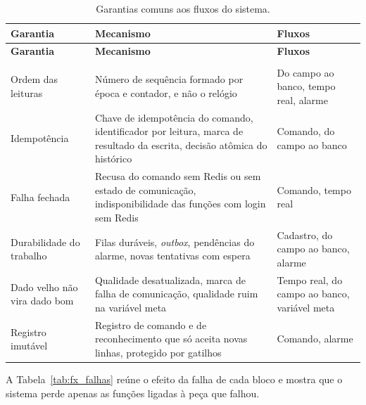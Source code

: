 {\renewcommand{\arraystretch}{1.3}\small
\begin{xltabular}{\textwidth}{>{\raggedright\arraybackslash}p{3.2cm}>{\raggedright\arraybackslash}X>{\raggedright\arraybackslash}p{4.2cm}}
    \caption{Garantias comuns aos fluxos do sistema.}
    \label{tab:fx_garantias}\\
    \hline
    \textbf{Garantia} & \textbf{Mecanismo} & \textbf{Fluxos} \\
    \hline
    \endfirsthead
    \hline
    \textbf{Garantia} & \textbf{Mecanismo} & \textbf{Fluxos} \\
    \hline
    \endhead
    \endfoot
     \\
    \endlastfoot
    Ordem das leituras & Número de sequência formado por época e contador, e não o relógio & Do campo ao banco, tempo real, alarme \\
    \hline
    Idempotência & Chave de idempotência do comando, identificador por leitura, marca de resultado da escrita, decisão atômica do histórico & Comando, do campo ao banco \\
    \hline
    Falha fechada & Recusa do comando sem Redis ou sem estado de comunicação, indisponibilidade das funções com login sem Redis & Comando, tempo real \\
    \hline
    Durabilidade do trabalho & Filas duráveis, \emph{outbox}, pendências do alarme, novas tentativas com espera & Cadastro, do campo ao banco, alarme \\
    \hline
    Dado velho não vira dado bom & Qualidade desatualizada, marca de falha de comunicação, qualidade ruim na variável meta & Tempo real, do campo ao banco, variável meta \\
    \hline
    Registro imutável & Registro de comando e de reconhecimento que só aceita novas linhas, protegido por gatilhos & Comando, alarme \\
    \hline
\end{xltabular}}

\par A Tabela~\ref{tab:fx_falhas} reúne o efeito da falha de cada bloco e mostra que o sistema perde apenas as funções ligadas à peça que falhou.

